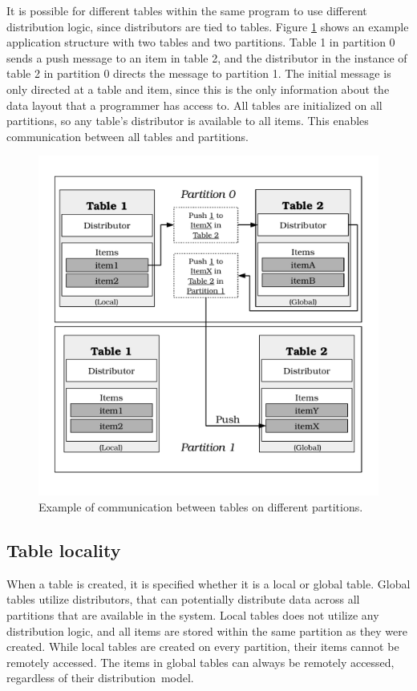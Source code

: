 \documentclass{uit-report}
\begin{document}
It is possible for different tables within the same program to use different distribution logic, since distributors are tied to tables. Figure \ref{fig:communication} shows an example application structure with two tables and two partitions. Table 1 in partition 0 sends a push message to an item in table 2, and the distributor in the instance of table 2 in partition 0 directs the message to partition 1. The initial message is only directed at a table and item, since this is the only information about the data layout that a programmer has access to. All tables are initialized on all partitions, so any table's distributor is available to all items. This enables communication between all tables and partitions.

\begin{figure}[H]
	\centering
	\includegraphics[width=13cm]{illustrations/communication.pdf}
	\caption{Example of communication between tables on different partitions.}
	\label{fig:communication}
\end{figure}

\subsection{Table locality}
When a table is created, it is specified whether it is a local or global table. Global tables utilize distributors, that can potentially distribute data across all partitions that are available in the system. Local tables does not utilize any distribution logic, and all items are stored within the same partition as they were created. While local tables are created on every partition, their items cannot be remotely accessed. The items in global tables can always be remotely accessed, regardless of their distribution~model.
\end{document}
